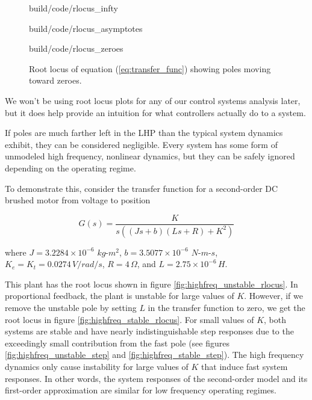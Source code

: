 \begin{figure}
  \begin{minisvg}{build/code/rlocus_infty}
    \caption{Root locus showing pole moving toward negative infinity}
    \label{fig:rlocus_infty}
  \end{minisvg}
  \hfill
  \begin{minisvg}{build/code/rlocus_asymptotes}
    \caption{Root locus showing poles moving toward asymptotes}
    \label{fig:rlocus_asymptotes}
  \end{minisvg}
  \begin{minisvg}{build/code/rlocus_zeroes}
    \caption{Root locus of equation (\ref{eq:transfer_func}) showing poles
      moving toward zeroes.}
    \label{fig:rlocus_zeroes}
  \end{minisvg}
\end{figure}

We won't be using root locus plots for any of our control systems analysis
later, but it does help provide an intuition for what controllers actually do to
a system.

If poles are much farther left in the LHP than the typical \gls{system} dynamics
exhibit, they can be considered negligible. Every \gls{system} has some form of
unmodeled high frequency, nonlinear dynamics, but they can be safely ignored
depending on the operating regime.

To demonstrate this, consider the transfer function for a second-order DC
brushed motor from voltage to position

\begin{equation*}
  G(s) = \frac{K}{s((Js + b)(Ls + R) + K^2)}
\end{equation*}

where $J = 3.2284 \times 10^{-6}$ $kg$-$m^2$, $b = 3.5077 \times 10^{-6}$
$N$-$m$-$s$, $K_e = K_t = 0.0274 \,V/rad/s$, $R = 4 \,\Omega$, and
$L = 2.75 \times 10^{-6} \,H$.

This plant has the root locus shown in figure
\ref{fig:highfreq_unstable_rlocus}. In proportional feedback, the plant is
unstable for large values of $K$. However, if we remove the unstable pole by
setting $L$ in the transfer function to zero, we get the root locus in figure
\ref{fig:highfreq_stable_rlocus}. For small values of $K$, both systems are
stable and have nearly indistinguishable step responses due to the exceedingly
small contribution from the fast pole (see figures
\ref{fig:highfreq_unstable_step} and \ref{fig:highfreq_stable_step}). The high
frequency dynamics only cause instability for large values of $K$ that induce
fast system responses. In other words, the system responses of the second-order
model and its first-order approximation are similar for low frequency operating
regimes.

